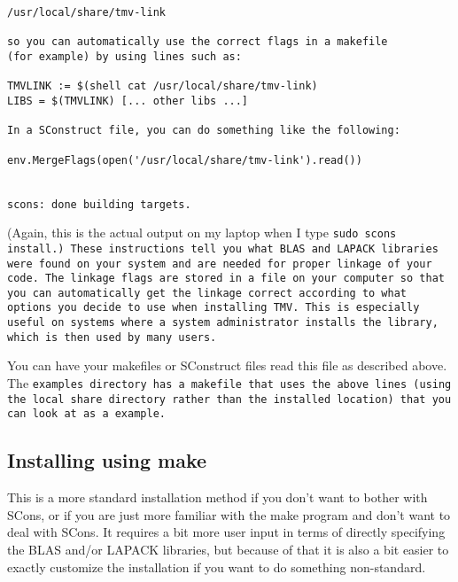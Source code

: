 \begin{enumerate}
\begin{verbatim}
/usr/local/share/tmv-link

so you can automatically use the correct flags in a makefile
(for example) by using lines such as:

TMVLINK := $(shell cat /usr/local/share/tmv-link)
LIBS = $(TMVLINK) [... other libs ...]

In a SConstruct file, you can do something like the following:

env.MergeFlags(open('/usr/local/share/tmv-link').read())


scons: done building targets.
\end{verbatim}
(Again, this is the actual output on my laptop when I type \tt{sudo scons install}.)
These instructions tell you what BLAS and LAPACK libraries were found on your system and 
are needed for proper linkage of your code.  The linkage flags are stored in a file on your
computer so that you can automatically get the linkage correct according to what options
you decide to use when installing TMV.  This is especially useful on systems where a
system administrator installs the library, which is then used by many users.  

You can have your makefiles or SConstruct files read this file as described above.
The \tt{examples} directory has a makefile that uses the above lines
(using the local \tt{share} directory rather than the installed location)
that you can look at as a example.

\end{enumerate}

\subsection{Installing using make}
\label{Install_Make}
This is a more standard installation method if you don't want to bother with SCons, or if you are just
more familiar with the make program and don't want to deal with SCons.  It requires a bit more
user input in terms of directly specifying the BLAS and/or LAPACK libraries, but because of that
it is also a bit easier to exactly customize the installation if you want to do something non-standard.

